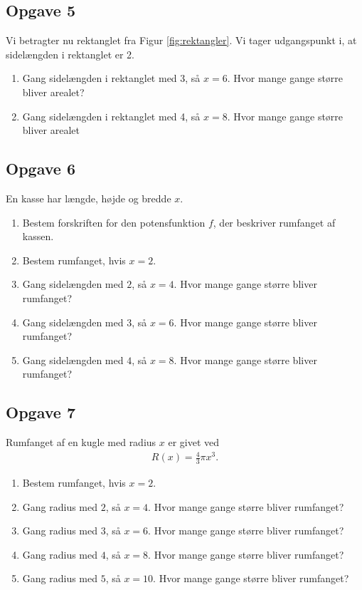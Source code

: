 \subsection*{Opgave 5}
Vi betragter nu rektanglet fra Figur \ref{fig:rektangler}. Vi tager udgangspunkt i, at sidelængden i rektanglet er 2.
\begin{enumerate}[label = \roman*)]
	\item Gang sidelængden i rektanglet med 3, så $x = 6$. Hvor mange gange større bliver arealet?
	\item Gang sidelængden i rektanglet med 4, så $x = 8$. Hvor mange gange større bliver arealet
\end{enumerate}

\subsection*{Opgave 6}
En kasse har længde, højde og bredde $x$. 
\begin{enumerate}[label=\roman*)]
	\item Bestem forskriften for den potensfunktion $f$, der beskriver rumfanget af kassen.
	\item Bestem rumfanget, hvis $x = 2$.
	\item Gang sidelængden med $2$, så $x = 4$. Hvor mange gange større bliver rumfanget?
	\item Gang sidelængden med $3$, så $x = 6$. Hvor mange gange større bliver rumfanget?
	\item Gang sidelængden med $4$, så $x = 8$. Hvor mange gange større bliver rumfanget?
\end{enumerate}



\subsection*{Opgave 7}
Rumfanget af en kugle med radius $x$ er givet ved
\begin{align*}
	R(x) = \frac{4}{3}\pi x^3.
\end{align*}
\begin{enumerate}[label = \roman*)]
	\item Bestem rumfanget, hvis $x = 2$.
	\item Gang radius med $2$, så $x = 4$. Hvor mange gange større bliver rumfanget?
	\item Gang radius med $3$, så $x = 6$. Hvor mange gange større bliver rumfanget?
	\item Gang radius med $4$, så $x = 8$. Hvor mange gange større bliver rumfanget?
	\item Gang radius med $5$, så $x = 10$. Hvor mange gange større bliver rumfanget?
\end{enumerate}

